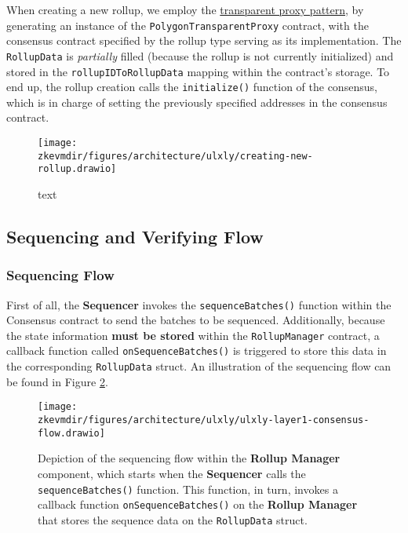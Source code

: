 When creating a new rollup, we employ the \href{https://blog.openzeppelin.com/the-transparent-proxy-pattern}{transparent proxy pattern}, by generating an instance of the \texttt{PolygonTransparentProxy} contract, with the consensus contract specified by the rollup type serving as its implementation. The \texttt{RollupData} is \textit{partially} filled (because the rollup is not currently initialized) and stored in the \texttt{rollupIDToRollupData} mapping within the contract's storage. To end up, the rollup creation calls the \texttt{initialize()} function of the consensus, which is in charge of setting the previously specified addresses in the consensus contract.

\vspace{1em}

\begin{figure}[H]
\centering
\texttt{[image: \\zkevmdir/figures/architecture/ulxly/creating-new-rollup.drawio]}
\caption{text}
\label{fig:transparent-proxy}
\end{figure}



\subsection{Sequencing and Verifying Flow}

\subsubsection{Sequencing Flow}

First of all, the \textbf{Sequencer} invokes the \texttt{sequenceBatches()} function within the Consensus contract to send the batches to be sequenced. Additionally, because the state information \textbf{must be stored} within the \texttt{RollupManager} contract, a callback function called \texttt{onSequenceBatches()} is triggered to store this data in the corresponding \texttt{RollupData} struct. An illustration of the sequencing flow can be found in Figure \ref{fig:consensus-flow}.

\vspace{1em}

\begin{figure}[h]
\centering
\texttt{[image: \\zkevmdir/figures/architecture/ulxly/ulxly-layer1-consensus-flow.drawio]}
\caption{Depiction of the sequencing flow within the \textbf{Rollup Manager} component, which starts when the \textbf{Sequencer} calls the \texttt{sequenceBatches()} function. This function, in turn, invokes a callback function \texttt{onSequenceBatches()} on the \textbf{Rollup Manager} that stores the sequence data on the \texttt{RollupData} struct. }
\label{fig:consensus-flow}
\end{figure}


